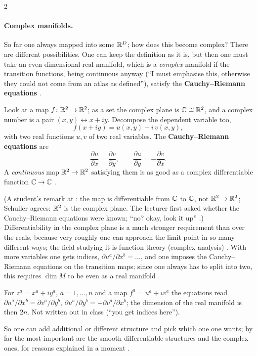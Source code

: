 \begin{paracol}{2}
\paragraph{Complex manifolds.} So far one always mapped into some $\mathbb{R}^D$; how does this become complex? There are different possibilities. One can keep the definition as it is, but then one must take an even-dimensional real manifold, which is a \emph{complex} manifold if the transition functions,
being continuous anyway (``I must emphasise this, otherwise they could not come from an atlas as defined''), satisfy the \textbf{Cauchy--Riemann equations} .
\begin{definition}\label{def:df-cr}
Look at a map $f\colon\mathbb{R}^2\to\mathbb{R}^2$; as a set the complex plane is $\mathbb{C}\cong\mathbb{R}^2$, and a complex number is a pair $(x,y)\leftrightarrow x+iy$. Decompose the dependent variable too,
\[
  f(x+iy)=u(x,y)+i\,v(x,y),
\]
with two real functions $u,v$ of two real variables. The \textbf{Cauchy--Riemann equations} are
\[
  \frac{\partial u}{\partial x}=\frac{\partial v}{\partial y},\qquad \frac{\partial u}{\partial y}=-\frac{\partial v}{\partial x}.
\]
A \emph{continuous} map $\mathbb{R}^2\to\mathbb{R}^2$ satisfying them is as good as a complex differentiable function $\mathbb{C}\to\mathbb{C}$ .
\end{definition}
(A student's remark at : the map is differentiable from $\mathbb{C}$ to $\mathbb{C}$, not $\mathbb{R}^2\to\mathbb{R}^2$; Schuller agrees: $\mathbb{R}^2$ is the complex plane. The lecturer first asked whether the Cauchy--Riemann equations were known; ``no? okay, look it up''
.)
Differentiability in the complex plane is a much stronger requirement than over the reals, because very roughly one can approach the limit point in so many different ways; the field studying it is function theory (complex analysis) . With more variables one
gets indices, $\partial u^a/\partial x^b=\ldots$, and one imposes the Cauchy--Riemann equations on the transition maps; since one always has to split into two, this requires $\dim M$ to be even as a real manifold .
\begin{coursenote}
For $z^a=x^a+iy^a$, $a=1,\dots,n$ and a map $f^a=u^a+iv^a$ the equations read $\partial u^a/\partial x^b=\partial v^a/\partial y^b$, $\partial u^a/\partial y^b=-\partial v^a/\partial x^b$; the dimension of the real manifold is then $2n$. Not written out in class (``you get indices here'').
\end{coursenote}
So one can add additional or different structure and pick which one one wants; by far the most important are the smooth differentiable structures and the complex ones, for reasons explained in a moment .


\end{paracol}
